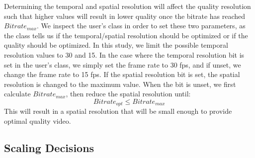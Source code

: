 \documentclass[preprint, 12pt]{elsarticle}
\begin{document}
Determining the temporal and spatial resolution will affect the quality resolution such that higher values will result in lower quality once the bitrate has reached $Bitrate_{max}$. We inspect the user’s class in order to set these two parameters, as the class tells us if the temporal/spatial resolution should be optimized or if the quality should be optimized. In this study, we limit the possible temporal resolution values to 30 and 15. In the case where the temporal resolution bit is set in the user’s class, we simply set the frame rate to 30 fps, and if unset, we change the frame rate to 15 fps. If the spatial resolution bit is set, the spatial resolution is changed to the maximum value. When the bit is unset, we first calculate $Bitrate_{max}$, then reduce the spatial resolution until:
\begin{equation}
\label{equ:OptMaxRelation}
Bitrate_{opt} \le Bitrate_{max}
\end{equation}
This will result in a spatial resolution that will be small enough to provide optimal quality video.

\subsection{Scaling Decisions}
\end{document}
